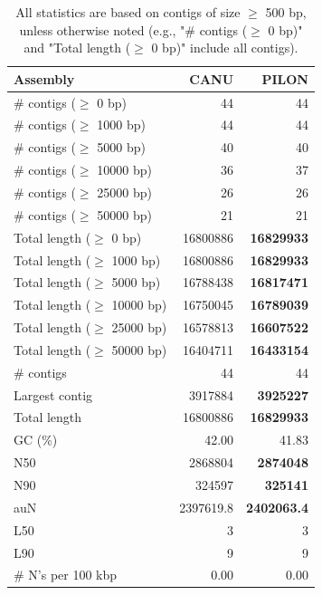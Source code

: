\documentclass[12pt,a4paper]{article}
\begin{document}
\begin{table}[ht]
\begin{center}
\caption{All statistics are based on contigs of size $\geq$ 500 bp, unless otherwise noted (e.g., "\# contigs ($\geq$ 0 bp)" and "Total length ($\geq$ 0 bp)" include all contigs).}
\begin{tabular}{|l*{2}{|r}|}
\hline
Assembly & CANU & PILON \\ \hline
\# contigs ($\geq$ 0 bp) & 44 & 44 \\ \hline
\# contigs ($\geq$ 1000 bp) & 44 & 44 \\ \hline
\# contigs ($\geq$ 5000 bp) & 40 & 40 \\ \hline
\# contigs ($\geq$ 10000 bp) & 36 & 37 \\ \hline
\# contigs ($\geq$ 25000 bp) & 26 & 26 \\ \hline
\# contigs ($\geq$ 50000 bp) & 21 & 21 \\ \hline
Total length ($\geq$ 0 bp) & 16800886 & {\bf 16829933} \\ \hline
Total length ($\geq$ 1000 bp) & 16800886 & {\bf 16829933} \\ \hline
Total length ($\geq$ 5000 bp) & 16788438 & {\bf 16817471} \\ \hline
Total length ($\geq$ 10000 bp) & 16750045 & {\bf 16789039} \\ \hline
Total length ($\geq$ 25000 bp) & 16578813 & {\bf 16607522} \\ \hline
Total length ($\geq$ 50000 bp) & 16404711 & {\bf 16433154} \\ \hline
\# contigs & 44 & 44 \\ \hline
Largest contig & 3917884 & {\bf 3925227} \\ \hline
Total length & 16800886 & {\bf 16829933} \\ \hline
GC (\%) & 42.00 & 41.83 \\ \hline
N50 & 2868804 & {\bf 2874048} \\ \hline
N90 & 324597 & {\bf 325141} \\ \hline
auN & 2397619.8 & {\bf 2402063.4} \\ \hline
L50 & 3 & 3 \\ \hline
L90 & 9 & 9 \\ \hline
\# N's per 100 kbp & 0.00 & 0.00 \\ \hline
\end{tabular}
\end{center}
\end{table}
\end{document}
